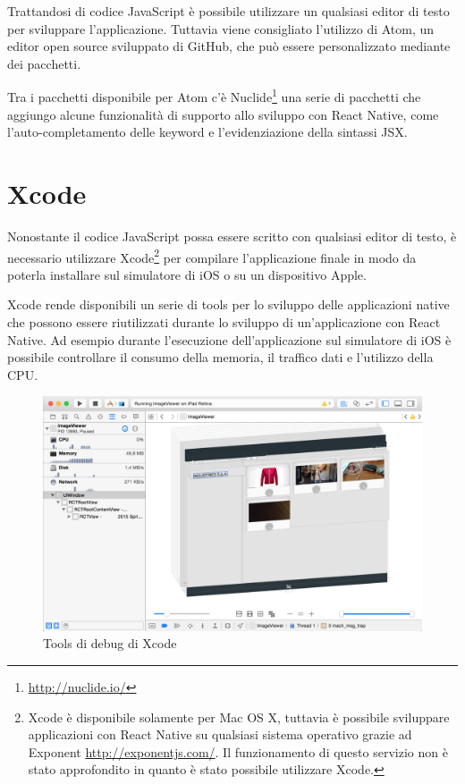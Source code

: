 Trattandosi di codice JavaScript è possibile utilizzare un qualsiasi editor di testo per sviluppare l'applicazione.
Tuttavia viene consigliato l'utilizzo di Atom, un editor open source sviluppato di GitHub, che può essere personalizzato mediante dei pacchetti.

Tra i pacchetti disponibile per Atom c'è Nuclide\footnote{\url{http://nuclide.io/}} una serie di pacchetti che aggiungo alcune funzionalità di supporto allo sviluppo con React Native, come l'auto-completamento delle keyword e l'evidenziazione della sintassi JSX.

\section{Xcode}

Nonostante il codice JavaScript possa essere scritto con qualsiasi editor di testo, è necessario utilizzare Xcode\footnote{Xcode è disponibile solamente per Mac OS X, tuttavia è possibile sviluppare applicazioni con React Native su qualsiasi sistema operativo grazie ad Exponent \url{http://exponentjs.com/}. Il funzionamento di questo servizio non è stato approfondito in quanto è stato possibile utilizzare Xcode.} per compilare l'applicazione finale in modo da poterla installare sul simulatore di iOS o su un dispositivo Apple.

Xcode rende disponibili un serie di tools per lo sviluppo delle applicazioni native che possono essere riutilizzati durante lo sviluppo di un'applicazione con React Native. Ad esempio durante l'esecuzione dell'applicazione sul simulatore di iOS è possibile controllare il consumo della memoria, il traffico dati e l'utilizzo della CPU.

\begin{figure}[htp]
\centering
\includegraphics[width=\textwidth]{../immagini/xcode-tools}
\caption{Tools di debug di Xcode}  
\end{figure}
\FloatBarrier

